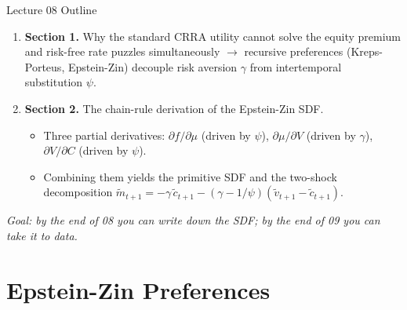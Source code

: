 \documentclass{beamer}
\begin{document}
\begin{frame}{Lecture 08 Outline}
	\begin{enumerate}
		\item \textbf{Section 1.} Why the standard CRRA utility cannot solve the equity premium and risk-free rate puzzles simultaneously $\rightarrow$ recursive preferences (Kreps-Porteus, Epstein-Zin) decouple risk aversion $\gamma$ from intertemporal substitution $\psi$.
		\item \textbf{Section 2.} The chain-rule derivation of the Epstein-Zin SDF.
		\begin{itemize}
			\item Three partial derivatives: $\partial f/\partial\mu$ (driven by $\psi$), $\partial\mu/\partial V$ (driven by $\gamma$), $\partial V/\partial C$ (driven by $\psi$).
			\item Combining them yields the primitive SDF and the two-shock decomposition $\widetilde{m}_{t+1} = -\gamma\,\widetilde{c}_{t+1} - (\gamma-1/\psi)(\widetilde{v}_{t+1}-\widetilde{c}_{t+1})$.
		\end{itemize}
	\end{enumerate}
	\vspace{4pt}
	\begin{center}
		\footnotesize \textit{Goal: by the end of 08 you can write down the SDF; by the end of 09 you can take it to data.}
	\end{center}
\end{frame}


\section{Epstein-Zin Preferences}
\end{document}

